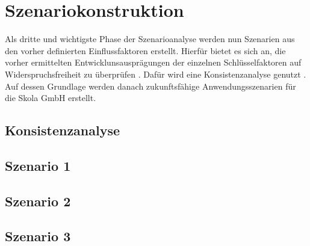 \section{Szenariokonstruktion}
\label{constructions}
Als dritte und wichtigste Phase der Szenarioanalyse werden nun Szenarien aus den vorher definierten Einflussfaktoren erstellt. Hierfür bietet es sich an, die vorher ermittelten Entwicklunsausprägungen der einzelnen Schlüsselfaktoren auf Widerspruchsfreiheit zu überprüfen . Dafür wird eine Konsistenzanalyse genutzt \cite{spath}. Auf dessen Grundlage werden danach zukunftsfähige Anwendungsszenarien für die Skola GmbH erstellt.

\subsection{Konsistenzanalyse}

\subsection{Szenario 1}

\subsection{Szenario 2}

\subsection{Szenario 3}

